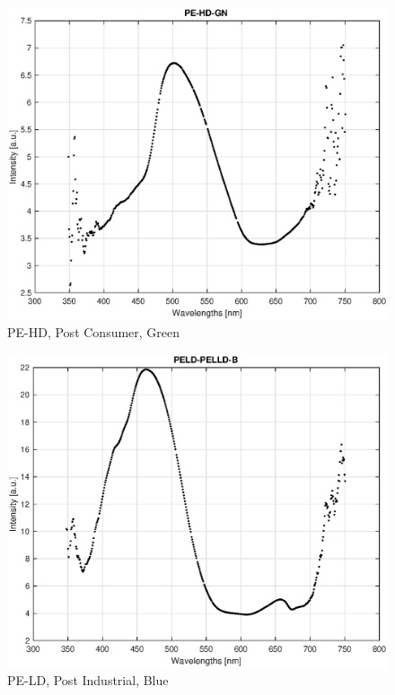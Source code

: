 \begin{appendices}
\begin{figure}
    \centering
    \includegraphics[width = 12cm]{Images/appendix/pe-hd-postconsumer-green.eps}
    \caption{PE-HD, Post Consumer, Green}
    \label{fig:pehd-green}
\end{figure}

\begin{figure}
    \centering
    \includegraphics[width = 12cm]{Images/appendix/pe-ld-postindust-blue.eps}
    \caption{PE-LD, Post Industrial, Blue}
    \label{fig:peld-blue}
\end{figure}


\end{appendices}

